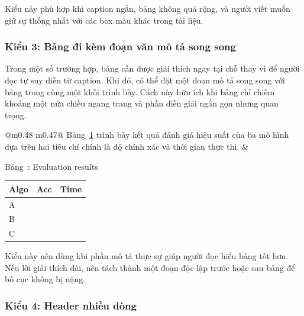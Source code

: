 \documentclass[12pt]{ai_conquer2026}
\begin{document}
Kiểu này phù hợp khi caption ngắn, bảng không quá rộng, và người viết muốn giữ sự thống nhất với các box màu khác trong tài liệu.

\subsubsection{Kiểu 3: Bảng đi kèm đoạn văn mô tả song song}

Trong một số trường hợp, bảng cần được giải thích ngay tại chỗ thay vì để người đọc tự suy diễn từ caption. Khi đó, có thể đặt một đoạn mô tả song song với bảng trong cùng một khối trình bày. Cách này hữu ích khi bảng chỉ chiếm khoảng một nửa chiều ngang trang và phần diễn giải ngắn gọn nhưng quan trọng.

\begin{table}[H]
\centering
\begin{tabular}{@{}m{0.48\linewidth} m{0.47\linewidth}@{}}
  \justifying
  \noindent Bảng~\ref{tab:eval-parallel} trình bày kết quả đánh giá hiệu suất của ba mô hình dựa trên hai tiêu chí chính là độ chính xác và thời gian thực thi.
  &
  \begin{minipage}{\linewidth}
    \begin{captionbelowboxaivn}
      Bảng~\thetable: Evaluation results
      \label{tab:eval-parallel}
    \end{captionbelowboxaivn}
    \renewcommand{\arraystretch}{1.3}
    \begin{tabularx}{\linewidth}{@{}>{\centering\arraybackslash}X >{\centering\arraybackslash}X >{\centering\arraybackslash}X@{}}
      \toprule
      \textbf{Algo} & \textbf{Acc} & \textbf{Time} \\
      \midrule
      A & 92.3 & 1.45 \\
      B & 89.7 & 1.32 \\
      C & 94.5 & 1.67 \\
      \bottomrule
    \end{tabularx}
  \end{minipage}
\end{tabular}
\end{table}

Kiểu này nên dùng khi phần mô tả thực sự giúp người đọc hiểu bảng tốt hơn. Nếu lời giải thích dài, nên tách thành một đoạn độc lập trước hoặc sau bảng để bố cục không bị nặng.

\subsubsection{Kiểu 4: Header nhiều dòng}
\end{document}
